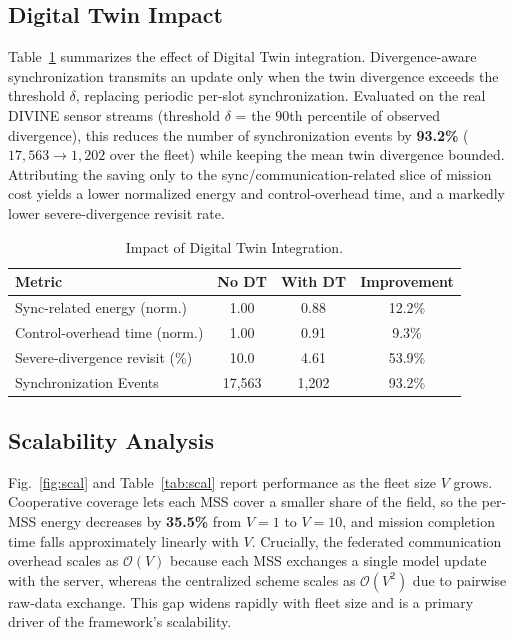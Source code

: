 \subsection{Digital Twin Impact}
\label{subsec:dt}
Table~\ref{tab:dt} summarizes the effect of Digital Twin integration.
Divergence-aware synchronization transmits an update only when the twin
divergence exceeds the threshold $\delta$, replacing periodic per-slot
synchronization. Evaluated on the real DIVINE sensor streams (threshold
$\delta$ = the $90$th percentile of observed divergence), this reduces the
number of synchronization events by \textbf{93.2\%} ($17{,}563\to1{,}202$ over
the fleet) while keeping the mean twin divergence bounded. Attributing the
saving only to the sync/communication-related slice of mission cost yields a
lower normalized energy and control-overhead time, and a markedly lower
severe-divergence revisit rate.

\begin{table}[!t]
\centering
\caption{Impact of Digital Twin Integration.}
\label{tab:dt}
\begin{tabular}{lccc}
\toprule
Metric & No DT & With DT & Improvement \\
\midrule
Sync-related energy (norm.)      & 1.00   & 0.88  & 12.2\% \\
Control-overhead time (norm.)    & 1.00   & 0.91  & 9.3\% \\
Severe-divergence revisit (\%)   & 10.0   & 4.61  & 53.9\% \\
Synchronization Events           & 17{,}563 & 1{,}202 & 93.2\% \\
\bottomrule
\end{tabular}
\end{table}

\subsection{Scalability Analysis}
\label{subsec:scalability}
Fig.~\ref{fig:scal} and Table~\ref{tab:scal} report performance as the fleet
size $V$ grows. Cooperative coverage lets each MSS cover a smaller share of the
field, so the per-MSS energy decreases by \textbf{35.5\%} from $V=1$ to $V=10$,
and mission completion time falls approximately linearly with $V$. Crucially,
the federated communication overhead scales as $\mathcal{O}(V)$ because each MSS
exchanges a single model update with the server, whereas the centralized scheme
scales as $\mathcal{O}(V^2)$ due to pairwise raw-data exchange. This gap widens
rapidly with fleet size and is a primary driver of the framework's
scalability.

